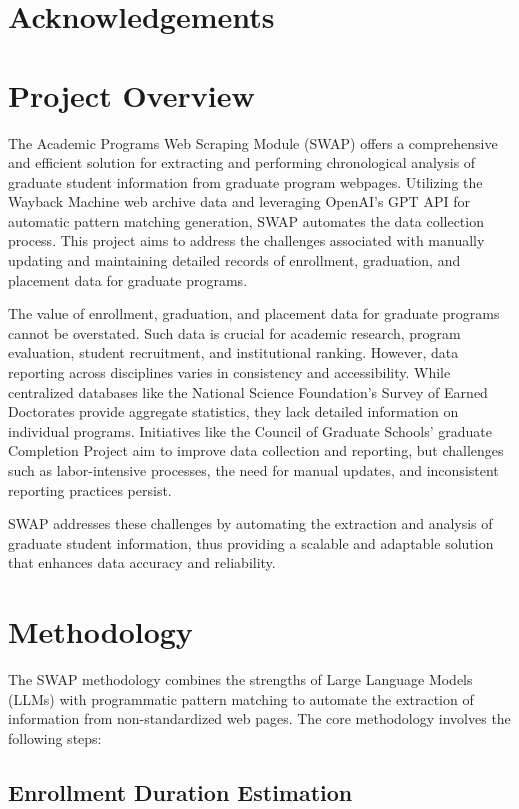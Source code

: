 \documentclass[11pt]{article}
\begin{document}
\section{Acknowledgements}


\section{Project Overview}

The Academic Programs Web Scraping Module (SWAP) offers a comprehensive and efficient solution for extracting and performing chronological analysis of graduate student information from graduate program webpages.
Utilizing the Wayback Machine web archive data and leveraging OpenAI's GPT API for automatic pattern matching generation, SWAP automates the data collection process.
This project aims to address the challenges associated with manually updating and maintaining detailed records of enrollment, graduation, and placement data for graduate programs.

The value of enrollment, graduation, and placement data for graduate programs cannot be overstated.
Such data is crucial for academic research, program evaluation, student recruitment, and institutional ranking.
However, data reporting across disciplines varies in consistency and accessibility.
While centralized databases like the National Science Foundation's Survey of Earned Doctorates provide aggregate statistics, they lack detailed information on individual programs.
Initiatives like the Council of Graduate Schools' graduate Completion Project aim to improve data collection and reporting, but challenges such as labor-intensive processes, the need for manual updates, and inconsistent reporting practices persist.

SWAP addresses these challenges by automating the extraction and analysis of graduate student information, thus providing a scalable and adaptable solution that enhances data accuracy and reliability.

\section{Methodology}

The SWAP methodology combines the strengths of Large Language Models (LLMs) with programmatic pattern matching to automate the extraction of information from non-standardized web pages. The core methodology involves the following steps:

\subsection{Enrollment Duration Estimation}
\end{document}
